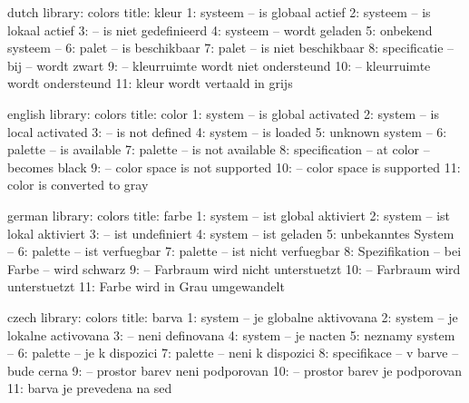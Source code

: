 \startmessages  dutch  library: colors
  title: kleur
      1: systeem -- is globaal actief
      2: systeem -- is lokaal actief
      3: -- is niet gedefinieerd
      4: systeem -- wordt geladen
      5: onbekend systeem --
      6: palet -- is beschikbaar
      7: palet -- is niet beschikbaar
      8: specificatie -- bij -- wordt zwart
      9: -- kleurruimte wordt niet ondersteund
     10: -- kleurruimte wordt ondersteund
     11: kleur wordt vertaald in grijs
\stopmessages

\startmessages  english  library: colors
  title: color
      1: system -- is global activated 
      2: system -- is local activated 
      3: -- is not defined
      4: system -- is loaded
      5: unknown system --
      6: palette -- is available
      7: palette -- is not available 
      8: specification -- at color -- becomes black
      9: -- color space is not supported 
     10: -- color space is supported 
     11: color is converted to gray
\stopmessages

\startmessages  german  library: colors
  title: farbe
      1: system -- ist global aktiviert
      2: system -- ist lokal aktiviert
      3: -- ist undefiniert
      4: system -- ist geladen
      5: unbekanntes System --
      6: palette -- ist verfuegbar
      7: palette -- ist nicht verfuegbar
      8: Spezifikation -- bei Farbe -- wird schwarz
      9: -- Farbraum wird nicht unterstuetzt
     10: -- Farbraum wird unterstuetzt 
     11: Farbe wird in Grau umgewandelt
\stopmessages

\startmessages  czech  library: colors
  title: barva
      1: system -- je globalne aktivovana
      2: system -- je lokalne activovana
      3: -- neni definovana
      4: system -- je nacten
      5: neznamy system --
      6: palette -- je k dispozici
      7: palette -- neni k dispozici
      8: specifikace -- v barve -- bude cerna
      9: -- prostor barev neni podporovan
     10: -- prostor barev je podporovan
     11: barva je prevedena na sed
\stopmessages


